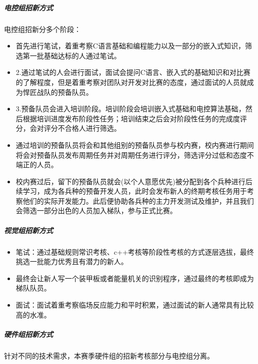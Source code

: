             \subparagraph{电控组招新方式}

                电控组招新分多个阶段：


                \begin{itemize}
                    \item 首先进行笔试，着重考察C语言基础和编程能力以及一部分的嵌入式知识，筛选第一批基础达标的人通过笔试。
                    \item 2.通过笔试的人会进行面试，面试会提问C语言、嵌入式的基础知识和对比赛的了解程度，但是着重考察对团队对开发对比赛的态度，通过面试的人员就成为悍匠战队的预备队员。
                    \item 3.预备队员会进入培训阶段。培训阶段会培训嵌入式基础和电控算法基础，然后根据培训进度发布阶段性任务；培训结束之后会对阶段性任务的完成度评分，会对评分不合格人进行筛选。
                    \item 通过培训的预备队员将会和其他组别的预备队员参与校内赛，校内赛进行期间将会对预备队员发布周期任务并对周期任务进行评分，筛选评分过低和态度不端正的人员。
                    \item 校内赛过后，留下的预备队员就会(以个人意愿优先)被分配到各个兵种进行后续学习，成为各兵种的预备开发人员，此时会发布新人的终期考核任务用于考察他们的实际开发能力。此后便协助各兵种的主力开发测试及维护，并且我们会筛选一部分出色的人员加入梯队，参与正式比赛。
                \end{itemize}

            \subparagraph{视觉组招新方式}


                \begin{itemize}
                    \item 笔试：通过基础规则常识考核、c++考核等阶段性考核的方式逐层选拔，最终挑选一批能力优秀且有潜力的新人。
                    \item 最终会让新人写一个装甲板或者能量机关的识别程序，通过最终的考核即成为梯队队员。
                    \item 面试：面试着重考察临场反应能力和平时积累，通过面试的新人通常具有比较高的水准。
                \end{itemize}

            \subparagraph{硬件组招新方式}

                针对不同的技术需求，本赛季硬件组的招新考核部分与电控组分离。

